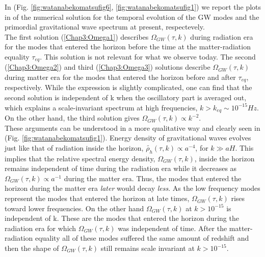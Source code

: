 \documentclass[11pt,a4paper,twoside]{book}
\begin{document}
In (Fig. \ref{fig:watanabekomatsufig6}, \ref{fig:watanabekomatsufig1}) we report the plots in \cite{Chap3:GW_Watanabe_Komatsu} of the  numerical solution for the temporal evolution of the GW modes and the primordial gravitational wave spectrum at present, respectevely.\\
The first solution (\ref{Chap3:Omega1}) describes $ \Omega_{GW}(\tau,k) $ during radiation era for the modes that entered the horizon before the time at the matter-radiation equality $ \tau_{eq} $. This solution is not relevant for what we observe today. The second (\ref{Chap3:Omega2}) and third (\ref{Chap3:Omega3}) solutions describe $\Omega_{GW}(\tau,k)$ during matter era for the modes that entered the horizon before and after $\tau_{eq}$, respectively. While the expression is slightly complicated, one can find that the second solution is independent of k when the oscillatory part is averaged out, which explains  a scale-invariant spectrum at high frequencies, $ k>k_{eq} \sim 10^{-15} Hz $. On the other hand, the third solution gives $ \Omega_{GW}(\tau,k) \propto k^{-2} $.\\
These arguments can be understood in a more qualitative way and clearly seen in (Fig. \ref{fig:watanabekomatsufig1}). Energy density of gravitational waves evolves just like that of radiation inside the horizon, $ \tilde{\rho_{h}}(\tau,k) \propto a^{-4} $, for $ k\gg aH $. This implies that the relative spectral energy density, $ \Omega_{GW}(\tau,k) $, inside the horizon remains independent of time during the radiation era while it decreases as $ \Omega_{GW}(\tau,k) \propto a^{-1} $ during the matter era. Thus, the modes that entered the horizon during the matter era \textit{later} would decay \textit{less}. As the low frequency modes represent the modes that entered the horizon at late times, $\Omega_{GW}(\tau,k)$ rises toward lower frequencies. On the other hand  $\Omega_{GW}(\tau,k)$ at $  k > 10^{-15} $ is independent of k. These are the modes that entered the horizon  during the radiation era for which $ \Omega_{GW} (\tau,k) $ was independent of time. After the matter-radiation equality all of these modes suffered the same amount of redshift and then the shape of $\Omega_{GW}(\tau,k)$ still remains scale invariant at  $  k > 10^{-15} $.
\end{document}
